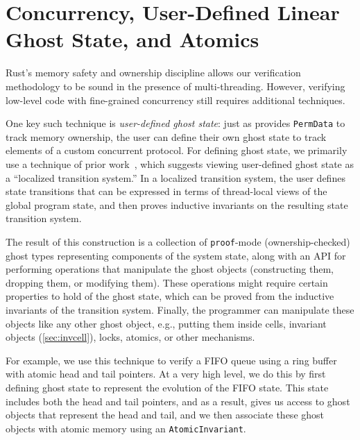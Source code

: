 \section{Concurrency, User-Defined Linear Ghost State, and Atomics} \label{sec:concurrency}

Rust's memory safety and ownership discipline allows our verification methodology to be sound in the presence of multi-threading.
However, verifying low-level code with fine-grained concurrency still requires additional techniques.

One key such technique is \emph{user-defined ghost state}: just as \verus provides
\verb`PermData` to track memory ownership,
the user can define their own ghost state to track elements of a custom concurrent protocol.
For defining ghost state, we primarily use a technique of prior work~\cite{ironsync-tr},
which suggests viewing user-defined ghost state as a ``localized transition system.''
In a localized transition system,
the user defines state transitions that can be expressed in terms of
thread-local views of the global program state, and then proves inductive invariants
on the resulting state transition system.

The result of this construction is a collection of \verb`proof`-mode (ownership-checked)  ghost types
representing components of the system state, along with an API for performing operations that manipulate
the ghost objects (constructing them, dropping them, or modifying them).
These operations might require certain properties to hold of the ghost state,
which can be proved from the inductive invariants of the transition system.
Finally, the programmer can manipulate these objects like any other ghost object, e.g., putting them
inside cells, invariant objects (\autoref{sec:invcell}), locks, atomics, or other mechanisms.

For example, we use this technique to verify a FIFO queue using a ring buffer with
atomic head and tail pointers.
At a very high level, we do this by first defining ghost state to represent the evolution
of the FIFO state. This state includes both the head and tail pointers, and as a result,
\verus gives us access to ghost objects that represent the head and tail,
and we then associate these ghost objects with atomic memory using an \verb`AtomicInvariant`.

